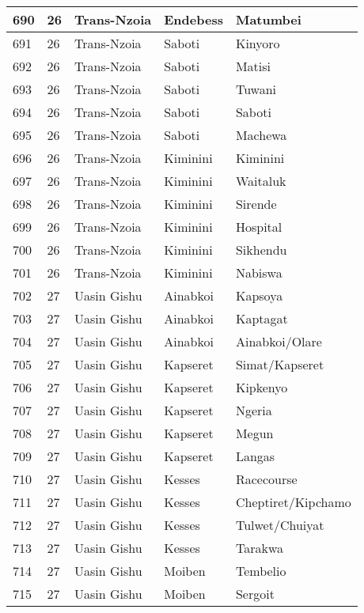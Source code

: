 \begin{table}[!ht]
\begin{tabular}{|l|l|l|l|l|}
        690 & 26 & Trans-Nzoia & Endebess & Matumbei \\ \hline
        691 & 26 & Trans-Nzoia & Saboti & Kinyoro \\ \hline
        692 & 26 & Trans-Nzoia & Saboti & Matisi \\ \hline
        693 & 26 & Trans-Nzoia & Saboti & Tuwani \\ \hline
        694 & 26 & Trans-Nzoia & Saboti & Saboti \\ \hline
        695 & 26 & Trans-Nzoia & Saboti & Machewa \\ \hline
        696 & 26 & Trans-Nzoia & Kiminini & Kiminini \\ \hline
        697 & 26 & Trans-Nzoia & Kiminini & Waitaluk \\ \hline
        698 & 26 & Trans-Nzoia & Kiminini & Sirende \\ \hline
        699 & 26 & Trans-Nzoia & Kiminini & Hospital \\ \hline
        700 & 26 & Trans-Nzoia & Kiminini & Sikhendu \\ \hline
        701 & 26 & Trans-Nzoia & Kiminini & Nabiswa \\ \hline
        702 & 27 & Uasin Gishu & Ainabkoi & Kapsoya \\ \hline
        703 & 27 & Uasin Gishu & Ainabkoi & Kaptagat \\ \hline
        704 & 27 & Uasin Gishu & Ainabkoi & Ainabkoi/Olare \\ \hline
        705 & 27 & Uasin Gishu & Kapseret & Simat/Kapseret \\ \hline
        706 & 27 & Uasin Gishu & Kapseret & Kipkenyo \\ \hline
        707 & 27 & Uasin Gishu & Kapseret & Ngeria \\ \hline
        708 & 27 & Uasin Gishu & Kapseret & Megun \\ \hline
        709 & 27 & Uasin Gishu & Kapseret & Langas \\ \hline
        710 & 27 & Uasin Gishu & Kesses & Racecourse \\ \hline
        711 & 27 & Uasin Gishu & Kesses & Cheptiret/Kipchamo \\ \hline
        712 & 27 & Uasin Gishu & Kesses & Tulwet/Chuiyat \\ \hline
        713 & 27 & Uasin Gishu & Kesses & Tarakwa \\ \hline
        714 & 27 & Uasin Gishu & Moiben & Tembelio \\ \hline
        715 & 27 & Uasin Gishu & Moiben & Sergoit \\ \hline

\end{tabular}
\end{table}
